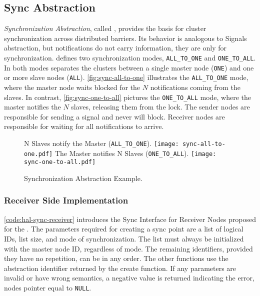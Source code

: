 
		\subsection{Sync Abstraction}
		\label{sec.sync-abs}

			\textit{Synchronization Abstraction}, called \sync, provides the
			basis for cluster synchronization across distributed barriers.
			Its behavior is analogous to \posix Signals abstraction, but
			notifications do not carry information, they are only for synchronization.
			\sync defines two synchronization modes, \texttt{ALL\_TO\_ONE} and
			\texttt{ONE\_TO\_ALL}. In both modes separates the clusters between
			a single master node (\texttt{ONE}) and one or more slave nodes
			(\texttt{ALL}). \autoref{fig:sync-all-to-one} illustrates the
			\texttt{ALL\_TO\_ONE} mode, where the master node waits blocked for
			the $N$ notifications coming from the slaves. In contrast,
			\autoref{fig:sync-one-to-all} pictures the \texttt{ONE\_TO\_ALL} mode,
			where the master notifies the $N$ slaves, releasing them from the lock.
			The sender nodes are responsible for sending a signal and never will
			block. Receiver nodes are responsible for waiting for all notifications
			to arrive.

			\begin{figure}[!tb]
				\centering%
				\caption{Synchronization Abstraction Example.}%
				\label{fig:sync-concepts}%

					{N Slaves notify the Master (\texttt{ALL\_TO\_ONE}).}%
					{\texttt{[image: sync-all-to-one.pdf]}}%
				\hfill%
					{The Master notifies N Slaves (\texttt{ONE\_TO\_ALL}).}%
					{\texttt{[image: sync-one-to-all.pdf]}}%

			\end{figure}

			\subsubsection{Receiver Side Implementation}

				\autoref{code:hal-sync-receiver} introduces the Sync Interface for
				Receiver Nodes proposed for the \nanvix \hal. The parameters required
				for creating a sync point are a list of logical IDs, list size,
				and mode of synchronization. The list must always be initialized
				with the master node ID, regardless of mode. The remaining identifiers,
				provided they have no repetition, can be in any order. The other
				functions use the abstraction identifier returned by the create
				function. If any parameters are invalid or have wrong
				semantics, a
				negative value is returned indicating the error, \eg nodes pointer
				equal to \texttt{NULL}.

